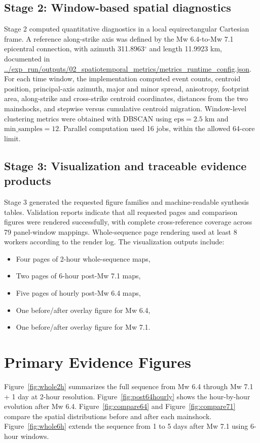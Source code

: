 \documentclass[11pt]{article}
\begin{document}
\subsection{Stage 2: Window-based spatial diagnostics}
Stage 2 computed quantitative diagnostics in a local equirectangular Cartesian frame. A reference along-strike axis was defined by the Mw 6.4-to-Mw 7.1 epicentral connection, with azimuth 311.8963$^{\circ}$ and length 11.9923 km, documented in
\url{../exp_run/outputs/02_spatiotemporal_metrics/metrics_runtime_config.json}.
For each time window, the implementation computed event counts, centroid position, principal-axis azimuth, major and minor spread, anisotropy, footprint area, along-strike and cross-strike centroid coordinates, distances from the two mainshocks, and stepwise versus cumulative centroid migration. Window-level clustering metrics were obtained with DBSCAN using $\mathrm{eps}=2.5$ km and $\mathrm{min\_samples}=12$. Parallel computation used 16 jobs, within the allowed 64-core limit.

\subsection{Stage 3: Visualization and traceable evidence products}
Stage 3 generated the requested figure families and machine-readable synthesis tables. Validation reports indicate that all requested pages and comparison figures were rendered successfully, with complete cross-reference coverage across 79 panel-window mappings. Whole-sequence page rendering used at least 8 workers according to the render log. The visualization outputs include:
\begin{itemize}[leftmargin=1.5em]
    \item Four pages of 2-hour whole-sequence maps,
    \item Two pages of 6-hour post-Mw 7.1 maps,
    \item Five pages of hourly post-Mw 6.4 maps,
    \item One before/after overlay figure for Mw 6.4,
    \item One before/after overlay figure for Mw 7.1.
\end{itemize}

\section{Primary Evidence Figures}
Figure~\ref{fig:whole2h} summarizes the full sequence from Mw 6.4 through Mw 7.1 + 1 day at 2-hour resolution. Figure~\ref{fig:post64hourly} shows the hour-by-hour evolution after Mw 6.4. Figure~\ref{fig:compare64} and Figure~\ref{fig:compare71} compare the spatial distributions before and after each mainshock. Figure~\ref{fig:whole6h} extends the sequence from 1 to 5 days after Mw 7.1 using 6-hour windows.
\end{document}
